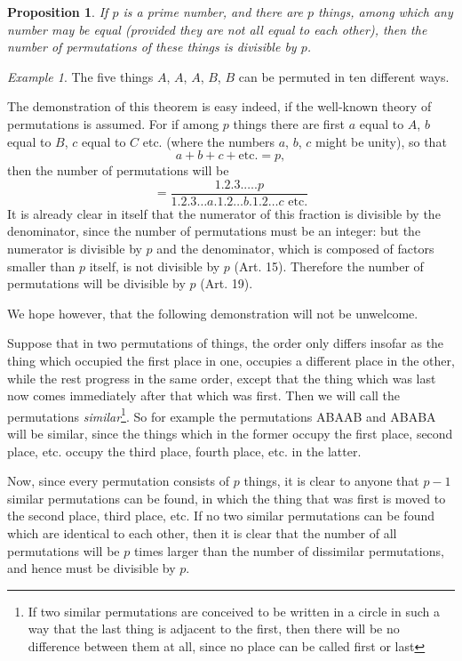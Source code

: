 \documentclass{book}
\theoremstyle{plain}
\newtheorem{proposition}{Proposition}
\theoremstyle{remark}
\newtheorem*{example}{Example}
\begin{document}
\begin{proposition} If $p$ is a prime number, and there are $p$ things, among which any number may be equal (provided they are not all equal to each other), then the number of permutations of these things is divisible by $p$. \end{proposition}
\begin{example} The five things $A$, $A$, $A$, $B$, $B$ can be permuted in ten different ways.  \end{example}
The demonstration of this theorem is easy indeed, if the well-known theory of permutations is assumed.  For if among $p$ things there are first $a$ equal to $A$, $b$ equal to $B$, $c$ equal to $C$ etc. (where the numbers $a$, $b$, $c$ might be unity), so that
\[ a + b + c + \mathrm{etc.} = p, \]
then the number of permutations will be 
\[ = \frac{1 .2.3.\dots.p}{1.2.3\dots a.1.2\dots b.1.2\dots c \textrm{ etc.}} \] 
It is already clear in itself that the numerator of this fraction is divisible by the denominator, since the number of permutations must be an integer: but the numerator is divisible by $p$ and the denominator, which is composed of factors smaller than $p$ itself, is not divisible by $p$ (Art. 15). Therefore the number of permutations will be divisible by $p$ (Art. 19).

We hope however, that the following demonstration will not be unwelcome. 

Suppose that in two permutations of things, the order only differs insofar as the thing which occupied the first place in one, occupies a different place in the other, while the rest progress in the same order, except that the thing which was last now comes immediately after that which was first.  Then we will call the permutations \emph{similar}\footnote{If two similar permutations are conceived to be written in a circle in such a way that the last thing is adjacent to the first, then there will be no difference between them at all, since no place can be called first or last}.  So for example the permutations ABAAB and ABABA will be similar, since the things which in the former occupy the first place, second place, etc. occupy the third place, fourth place, etc. in the latter.

Now, since every permutation consists of $p$ things, it is clear to anyone that $p-1$ similar permutations can be found, in which the thing that was first is moved to the second place, third place, etc.  If no two similar permutations can be found which are identical to each other, then it is clear that the number of all permutations will be $p$ times larger than the number of dissimilar permutations, and hence must be divisible by $p$.   
\end{document}
